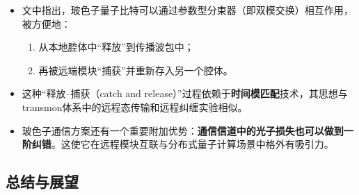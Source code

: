 \documentclass[12pt,a4paper,oneside]{ctexbook}
\begin{document}
\begin{itemize}
    \item 文中指出，玻色子量子比特可以通过参数型分束器（即双模交换）相互作用，被方便地：
    \begin{enumerate}
        \item 从本地腔体中“释放”到传播波包中；
        \item 再被远端模块“捕获”并重新存入另一个腔体。
    \end{enumerate}
    
    \item 这种“释放--捕获（catch and release）”过程依赖于\textbf{时间模匹配}技术，其思想与transmon体系中的远程态传输和远程纠缠实验相似。
    
    \item 玻色子通信方案还有一个重要附加优势：\textbf{通信信道中的光子损失也可以做到一阶纠错}。这使它在远程模块互联与分布式量子计算场景中格外有吸引力。
\end{itemize}

\subsection{总结与展望}
\end{document}
